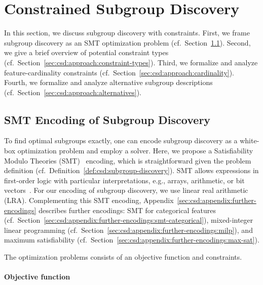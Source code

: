 \documentclass{article}
\theoremstyle{definition}
\begin{document}
\section{Constrained Subgroup Discovery}
\label{sec:csd:approach}

In this section, we discuss subgroup discovery with constraints.
First, we frame subgroup discovery as an SMT optimization problem (cf.~Section~\ref{sec:csd:approach:smt}).
Second, we give a brief overview of potential constraint types (cf.~Section~\ref{sec:csd:approach:constraint-types}).
Third, we formalize and analyze feature-cardinality constraints (cf.~Section~\ref{sec:csd:approach:cardinality}).
Fourth, we formalize and analyze alternative subgroup descriptions (cf.~Section~\ref{sec:csd:approach:alternatives}).

\subsection{SMT Encoding of Subgroup Discovery}
\label{sec:csd:approach:smt}

To find optimal subgroups exactly, one can encode subgroup discovery as a white-box optimization problem and employ a solver.
Here, we propose a Satisfiability Modulo Theories (SMT)~\cite{barrett2018satisfiability} encoding, which is straightforward given the problem definition (cf.~Definition~\ref{def:csd:subgroup-discovery}).
SMT allows expressions in first-order logic with particular interpretations, e.g., arrays, arithmetic, or bit vectors~\cite{barrett2018satisfiability}.
For our encoding of subgroup discovery, we use linear real arithmetic (LRA).
Complementing this SMT encoding, Appendix~\ref{sec:csd:appendix:further-encodings} describes further encodings:
SMT for categorical features (cf.~Section~\ref{sec:csd:appendix:further-encodings:smt-categorical}), mixed-integer linear programming (cf.~Section~\ref{sec:csd:appendix:further-encodings:milp}), and maximum satisfiability (cf.~Section~\ref{sec:csd:appendix:further-encodings:max-sat}).

The optimization problems consists of an objective function and constraints.

\paragraph{Objective function}
\end{document}
